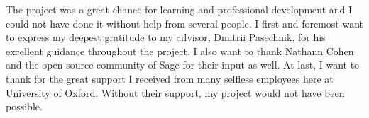 The project was a great chance for learning and professional development and 
I could not have done it without help from several people. I first and 
foremost want to express my deepest gratitude to my advisor, Dmitrii Pasechnik, for his excellent guidance throughout the project.  
I also want to thank Nathann Cohen and the open-source community 
of Sage for their input as well. At last, I want to thank 
for the great support I received from many selfless employees 
here at University of Oxford. Without their support, my project would not have been possible. 
